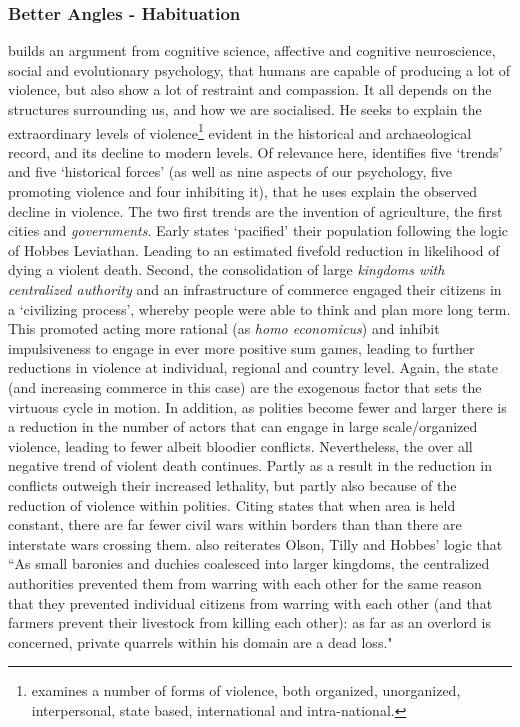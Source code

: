 \documentclass[12pt]{article}
\begin{document}
\subsubsection{Better Angles - Habituation}


\citet{Pinker2012} builds an argument from cognitive science, affective and
cognitive neuroscience, social and evolutionary  psychology, that humans are
capable of producing a lot of violence, but also show a lot of restraint and
compassion. It  all depends on the structures surrounding us, and how we are
socialised. He seeks to explain the extraordinary levels of
violence\footnote{\citet{Pinker2012} examines a number of forms of violence,
	both organized, unorganized, interpersonal, state based, international
and intra-national.} evident in the historical and archaeological record, and
its decline to modern levels.  Of relevance here, \citet{Pinker2012} identifies
five `trends' and five `historical forces' (as well as nine aspects of our
psychology, five promoting violence and four inhibiting it), that he uses
explain the observed decline in violence. The two first trends are the invention
of agriculture, the first cities and \textit{governments}. Early states
`pacified' their population following the logic of Hobbes Leviathan.  Leading to
an estimated fivefold reduction in likelihood of dying a violent death. Second,
the consolidation of large \textit{kingdoms with centralized authority} and an
infrastructure of commerce engaged their citizens in a `civilizing process',
whereby people were able to think and plan more long term.  This promoted acting
more rational (as \textit{homo economicus}) and inhibit impulsiveness to engage
in ever more positive sum games, leading to further reductions in violence at
individual, regional and country level. Again, the state (and increasing
commerce in this case) are the exogenous factor that sets the virtuous cycle in
motion. In addition, as polities become fewer and larger there is a reduction in
the number of actors that can engage in large scale/organized violence, leading
to fewer albeit bloodier conflicts. Nevertheless, the over all negative trend of
violent death continues. Partly as a result in the reduction in conflicts
outweigh their increased lethality, but partly also because of the reduction of
violence within polities. Citing \citet{richardson1960statistics}
\citet{Pinker2012} states that when area is held constant, there are far fewer
civil wars within borders than than there are interstate wars crossing them.
\citet{Pinker2012} also reiterates Olson, Tilly and Hobbes' logic that ``As
small baronies and duchies coalesced into larger kingdoms, the centralized
authorities prevented them from warring with each other for the same reason that
they prevented individual citizens from warring with each other (and that
farmers prevent their livestock from killing each other): as far as an overlord
is concerned, private quarrels within his domain are a dead loss."
\end{document}
